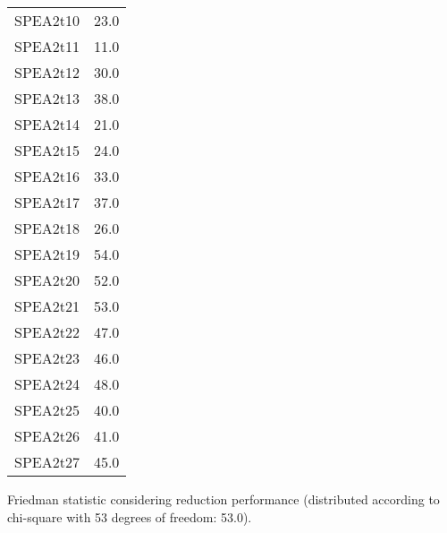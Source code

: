 \documentclass{article}
\begin{document}
\begin{table}[!htp]
\begin{tabular}{c|c}
SPEA2t10&23.0\\
SPEA2t11&11.0\\
SPEA2t12&30.0\\
SPEA2t13&38.0\\
SPEA2t14&21.0\\
SPEA2t15&24.0\\
SPEA2t16&33.0\\
SPEA2t17&37.0\\
SPEA2t18&26.0\\
SPEA2t19&54.0\\
SPEA2t20&52.0\\
SPEA2t21&53.0\\
SPEA2t22&47.0\\
SPEA2t23&46.0\\
SPEA2t24&48.0\\
SPEA2t25&40.0\\
SPEA2t26&41.0\\
SPEA2t27&45.0\\
\end{tabular}
\end{table}


Friedman statistic considering reduction performance (distributed according to chi-square with 53 degrees of freedom: 53.0).
\end{document}
